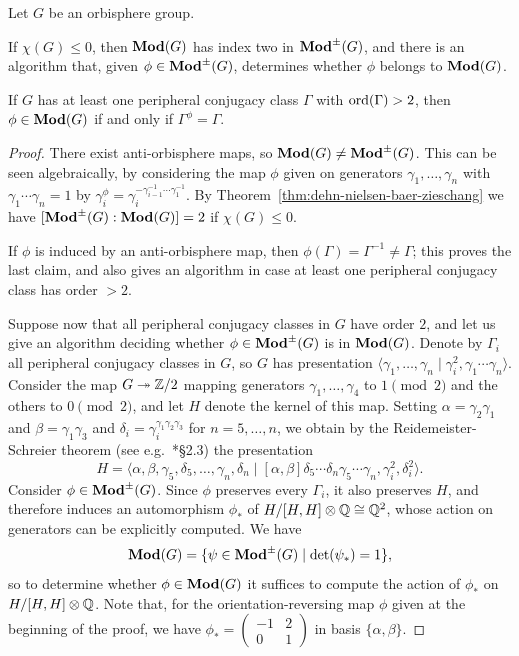 \documentclass{amsart}
\begin{document}
\begin{prop}\label{prop:OrbiIndByHomeo}
  Let $G$ be an orbisphere group. 

  If $\chi(G)\le0$, then $\mathbf{\relax Mod}(G)$ has index two in $\mathbf{\relax Mod}^\pm(G)$, and
  there is an algorithm that, given $\phi\in\mathbf{\relax Mod}^\pm(G)$, determines
  whether $\phi$ belongs to $\mathbf{\relax Mod}(G)$.

  If $G$ has at least one peripheral conjugacy class $\Gamma$ with
  $\operatorname{ord}(\Gamma)>2$, then $\phi\in\mathbf{\relax Mod}(G)$ if and only if
  $\Gamma^\phi=\Gamma$.
\end{prop}
\begin{proof}
  There exist anti-orbisphere maps, so $\mathbf{\relax Mod}(G)\neq\mathbf{\relax Mod}^\pm(G)$. This
  can be seen algebraically, by considering the map $\phi$ given on
  generators $\gamma_1,\dots,\gamma_n$ with $\gamma_1\cdots\gamma_n=1$
  by $\gamma_i^\phi=\gamma_i^{-\gamma_{i-1}^{-1}\cdots\gamma_1^{-1}}$.
  By Theorem~\ref{thm:dehn-nielsen-baer-zieschang} we have
  $[\mathbf{\relax Mod}^\pm(G):\mathbf{\relax Mod}(G)]=2$ if $\chi(G)\le0$.

  If $\phi$ is induced by an anti-orbisphere map, then
  $\phi(\Gamma)=\Gamma^{-1}\neq\Gamma$; this proves the last claim,
  and also gives an algorithm in case at least one peripheral
  conjugacy class has order $>2$. 

  Suppose now that all peripheral conjugacy classes in $G$ have order
  $2$, and let us give an algorithm deciding whether
  $\phi\in\mathbf{\relax Mod}^{\pm}(G)$ is in $\mathbf{\relax Mod}(G)$. Denote by $\Gamma_i$ all
  peripheral conjugacy classes in $G$, so $G$ has presentation
  $\langle\gamma_1,\dots,\gamma_n\mid\gamma_i^2,\gamma_1\cdots\gamma_n\rangle$.
  Consider the map $G\twoheadrightarrow{\mathbb Z}/2$ mapping generators
  $\gamma_1,\dots,\gamma_4$ to $1\pmod 2$ and the others to $0\pmod2$,
  and let $H$ denote the kernel of this map. Setting
  $\alpha=\gamma_2\gamma_1$ and $\beta=\gamma_1\gamma_3$ and
  $\delta_i=\gamma_i^{\gamma_1\gamma_2\gamma_3}$ for $n=5,\dots,n$, we
  obtain by the Reidemeister-Schreier theorem (see
  e.g.~\cite{magnus-k-s:cgt}*{\S2.3}) the presentation
  \[H=\langle\alpha,\beta,\gamma_5,\delta_5,\dots,\gamma_n,\delta_n\mid[\alpha,\beta]\delta_5\cdots\delta_n\gamma_5\cdots\gamma_n,\gamma_i^2,\delta_i^2\rangle.\]
  Consider $\phi\in\mathbf{\relax Mod}^{\pm}(G)$. Since $\phi$ preserves every
  $\Gamma_i$, it also preserves $H$, and therefore induces an
  automorphism $\phi_*$ of $H/[H,H]\otimes{\mathbb Q}\cong{\mathbb Q}^2$, whose action
  on generators can be explicitly computed. We have
  \[\mathbf{\relax Mod}(G)=\{\psi\in\mathbf{\relax Mod}^{\pm}(G)\mid\det(\psi_*)=1\},\]
  so to determine whether $\phi\in\mathbf{\relax Mod}(G)$ it suffices to compute the
  action of $\phi_*$ on $H/[H,H]\otimes{\mathbb Q}$. Note that, for the
  orientation-reversing map $\phi$ given at the beginning of the
  proof, we have
  $\phi_*=(\begin{smallmatrix}-1&2\\0&1\end{smallmatrix})$ in basis
  $\{\alpha,\beta\}$.
\end{proof}
\end{document}
